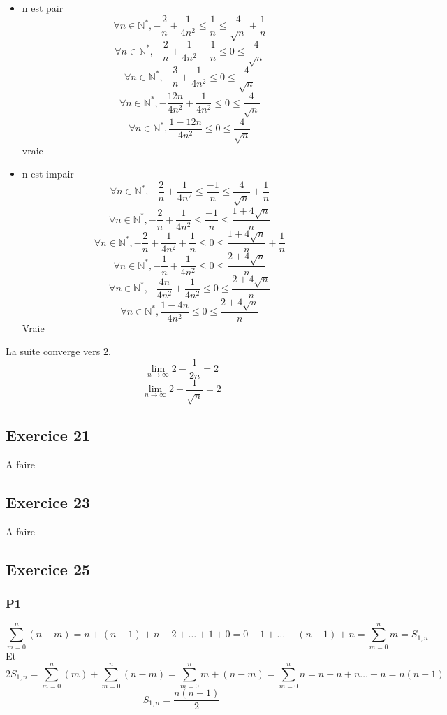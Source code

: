 \documentclass[]{book}
\theoremstyle{definition}
\newcommand{\bb}[1]{\mathbb{#1}}
\newcommand{\N}{\bb{N}}
\begin{document}
\begin{itemize}
\item n est pair
$$ \forall n \in \N^{*}, - \frac{2}{n} + \frac{1}{4n^2} \leq \frac{1}{n} \leq \frac{4}{\sqrt{n}} +\frac{1}{n}$$
$$ \forall n \in \N^{*}, - \frac{2}{n} + \frac{1}{4n^2} - \frac{1}{n}\leq 0 \leq \frac{4}{\sqrt{n}}$$
$$ \forall n \in \N^{*}, - \frac{3}{n} + \frac{1}{4n^2} \leq 0 \leq \frac{4}{\sqrt{n}}$$
$$ \forall n \in \N^{*}, - \frac{12n}{4n^2} + \frac{1}{4n^2} \leq 0 \leq \frac{4}{\sqrt{n}}$$
$$ \forall n \in \N^{*}, \frac{1-12n}{4n^2} \leq 0 \leq \frac{4}{\sqrt{n}}$$
vraie

\item n est impair
$$ \forall n \in \N^{*}, - \frac{2}{n} + \frac{1}{4n^2} \leq \frac{-1}{n} \leq \frac{4}{\sqrt{n}} +\frac{1}{n}$$
$$ \forall n \in \N^{*}, - \frac{2}{n} + \frac{1}{4n^2} \leq \frac{-1}{n} \leq \frac{1+4\sqrt{n}}{n}$$
$$ \forall n \in \N^{*}, - \frac{2}{n} + \frac{1}{4n^2} + \frac{1}{n} \leq 0 \leq \frac{1+4\sqrt{n}}{n} + \frac{1}{n}$$
$$ \forall n \in \N^{*}, - \frac{1}{n} + \frac{1}{4n^2} \leq 0 \leq \frac{2+4\sqrt{n}}{n}$$
$$ \forall n \in \N^{*}, - \frac{4n}{4n^2} + \frac{1}{4n^2} \leq 0 \leq \frac{2+4\sqrt{n}}{n}$$
$$ \forall n \in \N^{*}, \frac{1-4n}{4n^2} \leq 0 \leq \frac{2+4\sqrt{n}}{n}$$
Vraie
\end{itemize}

La suite converge vers $2$.
$$\lim_{n \to \infty}2 - \frac{1}{2n} = 2$$
$$\lim_{n \to \infty}2 - \frac{1}{\sqrt{n}} = 2$$

\subsection*{Exercice 21}
A faire


\subsection*{Exercice 23}
A faire


\subsection*{Exercice 25}
\subsubsection*{P1}
$$\sum_{m=0}^{n}(n-m) = n + (n-1) + n-2 + \ldots + 1 + 0 = 0 + 1 + \ldots + (n-1) + n = \sum_{m=0}^{n}m=S_{1,n}$$
Et
$$2S_{1,n} = \sum_{m=0}^{n}(m)+\sum_{m=0}^{n}(n-m) = \sum_{m=0}^{n}m+(n-m) = \sum_{m=0}^{n}n = n+n+n \ldots +n = n(n+1)$$
$$S_{1,n} = \frac{n(n+1)}{2}$$
\end{document}
